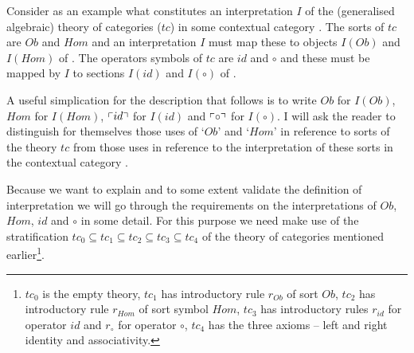 

\newcommand{\sect}{Sect}
\newcommand{\insect}[2]{#1 \in Sect(#2)}

\newcommand {\OO}{Ob^2}
\newcommand {\OOO}{Ob^3}
\newcommand {\OOOO}{Ob^4}
\newcommand{\HomOb}{\crossx{Hom}{Ob}{1}}
\newcommand{\fid}{\qq{id}}
\newcommand{\fcomp}{\qq{\circ}}

\newcommand{\leftidentitylhsterm}{({x_1}^*\qq{id})^*\tuple{x_1,x_1,x_2}^*\fcomp}
\newcommand{\rightidentitylhsterm}{({x_2}^*\qq{id})^*\tuple{x_1,x_2,x_2}^*\fcomp}
\newcommand{\HomHom}{\crossx{Hom}{Hom}{\OO}}

\newcommand {\yOOO}{\ofT{y_1,y_2,y_3}{Ob}}
\newcommand {\yOOOfH}{\yOOO,\,\ofT{f}{Hom(y_1,y_2)}}
\newcommand{\yOOOfHgH}{\yOOOfH,\,\ofT{g}{Hom(y_2,y_3)}}

\newcommand {\yOOOfHmapped}{\tuple{y_1,y_2}^*Hom}
\newcommand {\yOOOfHgHmapped}{\crossx{\yOOOfHmapped}{\tuple{y_2,y_3}^*Hom}{\OOO}}
\newcommand {\yOOOfHgHHmapped}{\crossx{\big(\yOOOfHgHmapped\big)}{{\tuple{y_1,y_3}^*Hom}}{\OOO}}

\iffalse

\note
Consider as an example
what constitutes an interpretation $I$ of the (generalised algebraic) theory of categories ($tc$) in some 
 contextual category \catc.
The sorts of $tc$ are $Ob$ and $Hom$ 
and an interpretation $I$ must map these to objects $I(Ob)$ and  $I(Hom)$ of \catc.
The operators symbols of
$tc$ are  $id$ and $\circ$ and these must be mapped by $I$ to sections $I(id)$ and $I(\circ)$ of \catc.

A useful simplication for the description that follows is to write $Ob$ for $I(Ob)$, $Hom$ for $I(Hom)$, $\left\ulcorner id\right\urcorner$ for $I(id)$ and   $\left\ulcorner\circ\right\urcorner$ for $I(\circ)$.   I will ask the reader  to distinguish for themselves 
those uses of `$Ob$' and `$Hom$' in reference to sorts of the theory $tc$ from those uses in reference to the interpretation of these sorts in the contextual category \catc. 

Because we want to explain and to some extent validate the definition of interpretation we will go through the
requirements on the interpretations of $Ob$, $Hom$, $id$ and $\circ$ in some detail.  For this purpose we
need make use of the stratification 
$tc_0 \subseteq tc_1 \subseteq tc_2 \subseteq tc_3 \subseteq tc_4$
of the theory of categories mentioned earlier\footnote{$tc_0$ is the empty theory, $tc_1$ has introductory rule 
$r_{Ob}$ of sort $Ob$, $tc_2$ has introductory rule $r_{Hom}$ of sort symbol $Hom$, $tc_3$ has introductory rules
$r_{id}$ for operator $id$ and  $r_\circ$ for operator $\circ$, $tc_4$ has the three axioms -- left and right identity and associativity.}.


